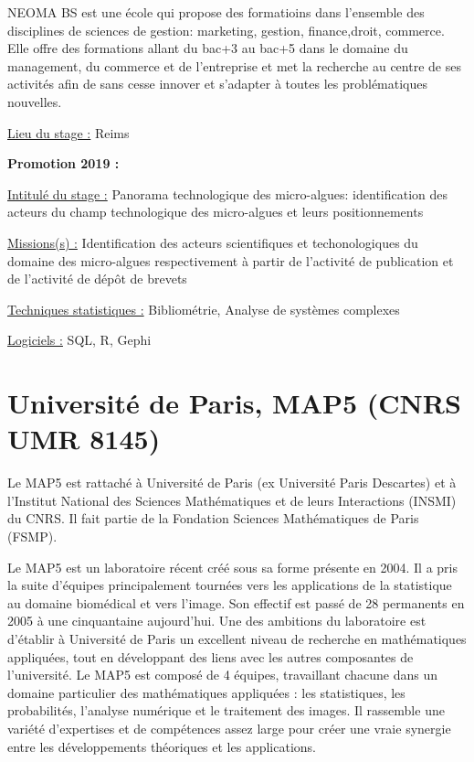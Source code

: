 \documentclass[
  letterpaper,
  DIV=11,
  numbers=noendperiod]{scrreprt}
\begin{document}
NEOMA BS est une école qui propose des formatioins dans l'ensemble des
disciplines de sciences de gestion: marketing, gestion, finance,droit,
commerce. Elle offre des formations allant du bac+3 au bac+5 dans le
domaine du management, du commerce et de l'entreprise et met la
recherche au centre de ses activités afin de sans cesse innover et
s'adapter à toutes les problématiques nouvelles.

\uline{Lieu du stage :} Reims

\textbf{Promotion 2019 :}

\uline{Intitulé du stage :} Panorama technologique des micro-algues:
identification des acteurs du champ technologique des micro-algues et
leurs positionnements

\uline{Missions(s) :} Identification des acteurs scientifiques et
techonologiques du domaine des micro-algues respectivement à partir de
l'activité de publication et de l'activité de dépôt de brevets

\uline{Techniques statistiques :} Bibliométrie, Analyse de systèmes
complexes

\uline{Logiciels :} SQL, R, Gephi

\hypertarget{universituxe9-de-paris-map5-cnrs-umr-8145}{%
\section{\texorpdfstring{\textbf{Université de Paris, MAP5 (CNRS UMR
8145)}}{Université de Paris, MAP5 (CNRS UMR 8145)}}\label{universituxe9-de-paris-map5-cnrs-umr-8145}}

Le MAP5 est rattaché à Université de Paris (ex Université Paris
Descartes) et à l'Institut National des Sciences Mathématiques et de
leurs Interactions (INSMI) du CNRS. Il fait partie de la Fondation
Sciences Mathématiques de Paris (FSMP).

Le MAP5 est un laboratoire récent créé sous sa forme présente en 2004.
Il a pris la suite d'équipes principalement tournées vers les
applications de la statistique au domaine biomédical et vers l'image.
Son effectif est passé de 28 permanents en 2005 à une cinquantaine
aujourd'hui. Une des ambitions du laboratoire est d'établir à Université
de Paris un excellent niveau de recherche en mathématiques appliquées,
tout en développant des liens avec les autres composantes de
l'université. Le MAP5 est composé de 4 équipes, travaillant chacune dans
un domaine particulier des mathématiques appliquées : les statistiques,
les probabilités, l'analyse numérique et le traitement des images. Il
rassemble une variété d'expertises et de compétences assez large pour
créer une vraie synergie entre les développements théoriques et les
applications.
\end{document}
